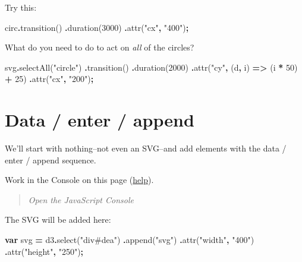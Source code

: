 \documentclass[
  openany]{book}
\newenvironment{Shaded}{\begin{snugshade}}{\end{snugshade}}
\newcommand{\DecValTok}[1]{\textcolor[rgb]{0.00,0.00,0.81}{#1}}
\newcommand{\FunctionTok}[1]{\textcolor[rgb]{0.00,0.00,0.00}{#1}}
\newcommand{\KeywordTok}[1]{\textcolor[rgb]{0.13,0.29,0.53}{\textbf{#1}}}
\newcommand{\NormalTok}[1]{#1}
\newcommand{\OperatorTok}[1]{\textcolor[rgb]{0.81,0.36,0.00}{\textbf{#1}}}
\newcommand{\StringTok}[1]{\textcolor[rgb]{0.31,0.60,0.02}{#1}}
\begin{document}
Try this:

\begin{Shaded}
\begin{Highlighting}[]
\NormalTok{circ}\OperatorTok{.}\FunctionTok{transition}\NormalTok{()}
  \OperatorTok{.}\FunctionTok{duration}\NormalTok{(}\DecValTok{3000}\NormalTok{)}
  \OperatorTok{.}\FunctionTok{attr}\NormalTok{(}\StringTok{"cx"}\OperatorTok{,} \StringTok{"400"}\NormalTok{)}\OperatorTok{;}
\end{Highlighting}
\end{Shaded}

What do you need to do to act on \emph{all} of the circles?

\begin{Shaded}
\begin{Highlighting}[]
\NormalTok{svg}\OperatorTok{.}\FunctionTok{selectAll}\NormalTok{(}\StringTok{"circle"}\NormalTok{)}
  \OperatorTok{.}\FunctionTok{transition}\NormalTok{()}
  \OperatorTok{.}\FunctionTok{duration}\NormalTok{(}\DecValTok{2000}\NormalTok{)}
  \OperatorTok{.}\FunctionTok{attr}\NormalTok{(}\StringTok{"cy"}\OperatorTok{,}\NormalTok{ (d}\OperatorTok{,}\NormalTok{ i) }\KeywordTok{=\textgreater{}}\NormalTok{ (i }\OperatorTok{*} \DecValTok{50}\NormalTok{) }\OperatorTok{+} \DecValTok{25}\NormalTok{)}
  \OperatorTok{.}\FunctionTok{attr}\NormalTok{(}\StringTok{"cx"}\OperatorTok{,} \StringTok{"200"}\NormalTok{)}\OperatorTok{;}
\end{Highlighting}
\end{Shaded}

\hypertarget{data-enter-append}{%
\section{\texorpdfstring{Data / enter / append }{Data / enter / append }}\label{data-enter-append}}

We'll start with nothing--not even an SVG--and add elements with the data / enter / append sequence.

Work in the Console on this page (\href{index.html\#this-book-console}{help}).

\begin{quote}
\emph{Open the JavaScript Console}
\end{quote}

The SVG will be added here:

\hypertarget{dea}{}

\begin{Shaded}
\begin{Highlighting}[]
\KeywordTok{var}\NormalTok{ svg }\OperatorTok{=}\NormalTok{ d3}\OperatorTok{.}\FunctionTok{select}\NormalTok{(}\StringTok{"div\#dea"}\NormalTok{)}
  \OperatorTok{.}\FunctionTok{append}\NormalTok{(}\StringTok{"svg"}\NormalTok{)}
  \OperatorTok{.}\FunctionTok{attr}\NormalTok{(}\StringTok{"width"}\OperatorTok{,} \StringTok{"400"}\NormalTok{)}
  \OperatorTok{.}\FunctionTok{attr}\NormalTok{(}\StringTok{"height"}\OperatorTok{,} \StringTok{"250"}\NormalTok{)}\OperatorTok{;}
\end{Highlighting}
\end{Shaded}
\end{document}
